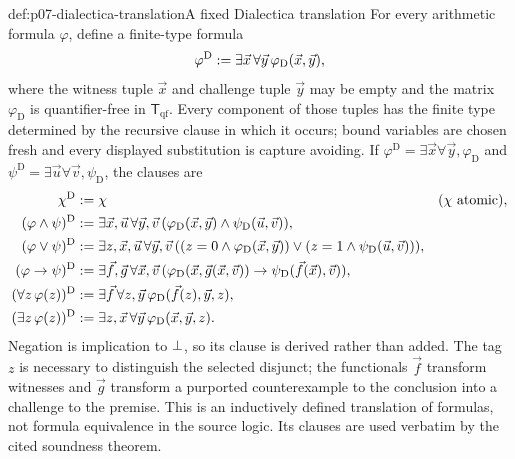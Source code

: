\begin{hbdefinition}{def:p07-dialectica-translation}{A fixed Dialectica translation}
For every arithmetic formula \(\varphi\), define a finite-type formula
\[
 \varphi^{\mathrm D}\mathrel{:=}
 \exists\vec x\,\forall\vec y\,
 \varphi_{\mathrm D}(\vec x,\vec y),
\]
where the witness tuple \(\vec x\) and challenge tuple \(\vec y\) may be
empty and the matrix \(\varphi_{\mathrm D}\) is quantifier-free in
\(\mathsf T_{\mathrm{qf}}\).  Every component of those tuples has the finite
type determined by the recursive clause in which it occurs; bound variables
are chosen fresh and every displayed substitution is capture avoiding.  If
\(\varphi^{\mathrm D}=\exists\vec x\forall\vec y,\varphi_{\mathrm D}\) and
\(\psi^{\mathrm D}=\exists\vec u\forall\vec v,\psi_{\mathrm D}\), the clauses are
\[
\begin{aligned}
 \chi^{\mathrm D}
   &\mathrel{:=} \chi &&(\chi\text{ atomic}),\\
 (\varphi\land\psi)^{\mathrm D}
   &\mathrel{:=} \exists\vec x,\vec u\,\forall\vec y,\vec v\,
       (\varphi_{\mathrm D}(\vec x,\vec y)\land
        \psi_{\mathrm D}(\vec u,\vec v)),\\
 (\varphi\lor\psi)^{\mathrm D}
   &\mathrel{:=} \exists z,\vec x,\vec u\,\forall\vec y,\vec v\,
       ((z=0\land\varphi_{\mathrm D}(\vec x,\vec y))\lor
        (z=1\land\psi_{\mathrm D}(\vec u,\vec v))),\\
 (\varphi\to\psi)^{\mathrm D}
   &\mathrel{:=} \exists\vec f,\vec g\,\forall\vec x,\vec v\,
       (\varphi_{\mathrm D}(\vec x,\vec g(\vec x,\vec v))\to
        \psi_{\mathrm D}(\vec f(\vec x),\vec v)),\\
 (\forall z\,\varphi(z))^{\mathrm D}
   &\mathrel{:=} \exists\vec f\,\forall z,\vec y\,
       \varphi_{\mathrm D}(\vec f(z),\vec y,z),\\
 (\exists z\,\varphi(z))^{\mathrm D}
   &\mathrel{:=} \exists z,\vec x\,\forall\vec y\,
       \varphi_{\mathrm D}(\vec x,\vec y,z).
\end{aligned}
\]
Negation is implication to \(\bot\), so its clause is derived rather than
added.  The tag \(z\) is necessary to distinguish the selected disjunct;
the functionals \(\vec f\) transform witnesses and \(\vec g\) transform a
purported counterexample to the conclusion into a challenge to the premise.
This is an inductively defined translation of formulas, not formula
equivalence in the source logic.  Its clauses are used verbatim by the cited
soundness theorem.
\end{hbdefinition}

